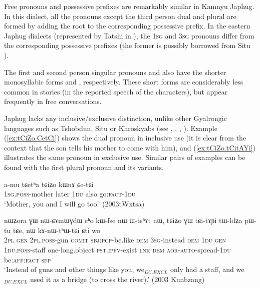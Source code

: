 Free pronouns and possessive prefixes are remarkably similar in Kamnyu Japhug. In this dialect, all the pronouns except the third person dual and plural are formed by adding the root  to the corresponding possessive prefix. In the eastern Japhug dialects (represented by Tatshi in ), the \textsc{1sg}   and \textsc{3sg}   pronouns differ from the corresponding possessive prefixes (the former is possibly borrowed from Situ ). 

The first and second person singular pronouns   and  also have the shorter monosyllabic forms  and , respectively. These short forms are considerably less common in stories (in the reported speech of the characters), but appear frequently in free conversations.

Japhug lacks any inclusive/exclusive distinction, unlike other Gyalrongic languages such as Tshobdun, Situ or Khroskyabs (see \citealt{jackson98morphology}, \citealt[177]{linxr93jiarong}, \citealt[92]{prins16kyomkyo}, \citealt[170]{lai17khroskyabs}). Example  (\ref{ex:tCiZo.CetCi}) shows the dual pronoun  in inclusive use (it is clear from the context that the son tells his mother to come with him), and (\ref{ex:tCiZo.tCitAYi}) illustrates the same pronoun in exclusive use. Similar pairs of examples can be found with the first plural pronoun  and its variants.

\begin{exe}
\ex \label{ex:tCiZo.CetCi}
\gll a-mu tɕetʰa tɕiʑo kɯnɤ ɕe-tɕi \\
\textsc{1sg}.\textsc{poss}-mother later \textsc{1du} also go:\textsc{fact}-\textsc{1du} \\
\glt `Mother, you and I will go too.' (2003tWxtsa)
\end{exe}

\begin{exe}
\ex \label{ex:tCiZo.tCitAYi}
\gll nɯʑora ɣɯ nɯ-ɕɤmɯɣdɯ cʰo kɯ-fse nɯ ɯ-tsʰɤt nɯ, tɕiʑo ɣɯ tɕi-tɤɲi tɯ-ldʑa pɯ-tu tɕe, nɯ kɤ-nɯ-tʰɯ-tɕi ɕti wo \\
\textsc{2pl} \textsc{gen} \textsc{2pl}.\textsc{poss}-gun \textsc{comit} \textsc{sbj}:\textsc{pcp}-be.like \textsc{dem} \textsc{3sg}-instead \textsc{dem} \textsc{1du} \textsc{gen} \textsc{1du}.\textsc{poss}-staff one-long.object \textsc{pst}.\textsc{ipfv}-exist \textsc{lnk} \textsc{dem} \textsc{aor}-\textsc{auto}-spread-\textsc{1du} be:\textsc{aff}:\textsc{fact} \textsc{sfp} \\
\glt `Instead of guns and other things like you, we$_{DU.EXCL}$ only had a staff, and we$_{DU.EXCL}$ used it as a bridge (to cross the river).' (2003 Kunbzang)
\end{exe}

